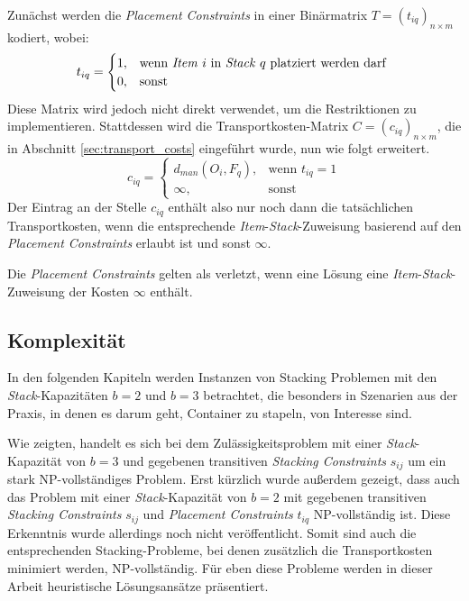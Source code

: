 Zunächst werden die \textit{Placement Constraints} in einer Binärmatrix $T = (t_{iq})_{n \times m}$ kodiert, wobei:\newline
\[
    t_{iq} =
\begin{cases}
    1, & \text{wenn \textit{Item} $i$ in \textit{Stack} $q$ platziert werden darf }\\
    0, & \text{sonst}
\end{cases}
\]
Diese Matrix wird jedoch nicht direkt verwendet, um die Restriktionen zu implementieren. Stattdessen wird
die Transportkosten-Matrix $C = (c_{iq})_{n \times m}$, die in Abschnitt \ref{sec:transport_costs} eingeführt wurde, nun wie folgt erweitert.
\[
    c_{iq} =
\begin{cases}
    d_{man}(O_i, F_q), & \text{wenn $t_{iq} = 1$}\\
    \infty, & \text{sonst}
\end{cases}
\]
Der Eintrag an der Stelle $c_{iq}$ enthält also nur noch dann die tatsächlichen Transportkosten, wenn die
entsprechende \textit{Item}-\textit{Stack}-Zuweisung basierend auf den \textit{Placement Constraints} erlaubt ist und sonst $\infty$.

Die \textit{Placement Constraints} gelten als verletzt, wenn eine Lösung eine \textit{Item}-\textit{Stack}-Zuweisung der Kosten $\infty$ enthält.

\pagebreak

\subsection{Komplexität}
\label{sec:complexity}

In den folgenden Kapiteln werden Instanzen von Stacking Problemen mit den \textit{Stack}-Kapazitäten $b = 2$ und $b = 3 $ betrachtet,
die besonders in Szenarien aus der Praxis, in denen es darum geht, Container zu stapeln, von Interesse sind.

Wie \citet{Bruns2015} zeigten, handelt es sich bei dem Zulässigkeitsproblem mit einer \textit{Stack}-Kapazität von $b=3$ und gegebenen transitiven \textit{Stacking Constraints} $s_{ij}$ um ein stark NP-vollständiges Problem. Erst kürzlich wurde außerdem gezeigt, dass auch das Problem mit einer \textit{Stack}-Kapazität von $b=2$ mit gegebenen transitiven \textit{Stacking Constraints} $s_{ij}$ und \textit{Placement Constraints} $t_{iq}$ NP-vollständig ist. Diese Erkenntnis wurde allerdings noch nicht veröffentlicht. Somit sind auch die entsprechenden Stacking-Probleme, bei denen zusätzlich die Transportkosten minimiert werden, NP-vollständig. Für eben diese Probleme werden in dieser Arbeit heuristische Lösungsansätze präsentiert.

